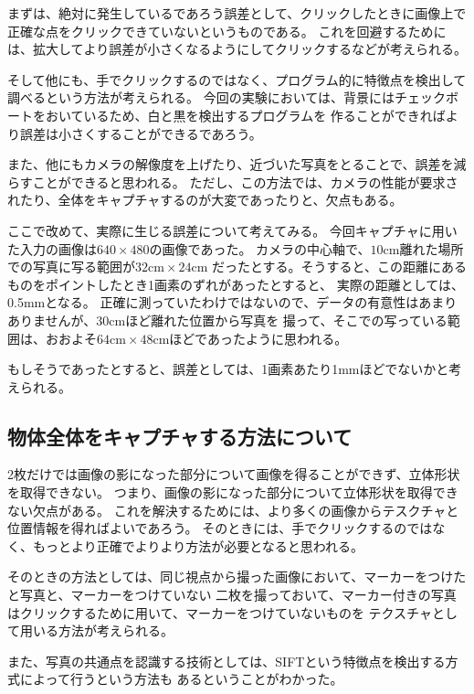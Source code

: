 \documentclass[11pt,a4j]{jsarticle}
\begin{document}
まずは、絶対に発生しているであろう誤差として、クリックしたときに画像上で正確な点をクリックできていないというものである。
これを回避するためには、拡大してより誤差が小さくなるようにしてクリックするなどが考えられる。

そして他にも、手でクリックするのではなく、プログラム的に特徴点を検出して調べるという方法が考えられる。
今回の実験においては、背景にはチェックボートをおいているため、白と黒を検出するプログラムを
作ることができればより誤差は小さくすることができるであろう。

また、他にもカメラの解像度を上げたり、近づいた写真をとることで、誤差を減らすことができると思われる。
ただし、この方法では、カメラの性能が要求されたり、全体をキャプチャするのが大変であったりと、欠点もある。

ここで改めて、実際に生じる誤差について考えてみる。
今回キャプチャに用いた入力の画像は$640 \times 480$の画像であった。
カメラの中心軸で、$10\mathrm{cm}$離れた場所での写真に写る範囲が$32\mathrm{cm} \times 24\mathrm{cm}$
だったとする。そうすると、この距離にあるものをポイントしたとき1画素のずれがあったとすると、
実際の距離としては、0.5mmとなる。
正確に測っていたわけではないので、データの有意性はあまりありませんが、30cmほど離れた位置から写真を
撮って、そこでの写っている範囲は、おおよそ$64\mathrm{cm} \times 48\mathrm{cm}$ほどであったように思われる。

もしそうであったとすると、誤差としては、1画素あたり1mmほどでないかと考えられる。

\subsection{物体全体をキャプチャする方法について}
\label{sub:物体全体をキャプチャする方法について}

2枚だけでは画像の影になった部分について画像を得ることができず、立体形状を取得できない。
つまり、画像の影になった部分について立体形状を取得できない欠点がある。
これを解決するためには、より多くの画像からテスクチャと位置情報を得ればよいであろう。
そのときには、手でクリックするのではなく、もっとより正確でよりより方法が必要となると思われる。

そのときの方法としては、同じ視点から撮った画像において、マーカーをつけたと写真と、マーカーをつけていない
二枚を撮っておいて、マーカー付きの写真はクリックするために用いて、マーカーをつけていないものを
テクスチャとして用いる方法が考えられる。

また、写真の共通点を認識する技術としては、SIFTという特徴点を検出する方式によって行うという方法も
あるということがわかった。
\end{document}

